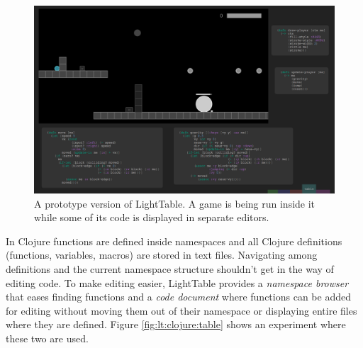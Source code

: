 \documentclass{./llncs2e/llncs}
\begin{document}

	\begin{figure}
	  \centering
	  \includegraphics[width=1.0\textwidth]{img/lt_game_example}
	    \caption{A prototype version of LightTable. A game is being run inside it while some of its code is displayed in separate editors.}
	  \label{fig:lt:draft:table}
	\end{figure} 

	In Clojure functions are defined inside namespaces and all Clojure definitions (functions, variables, macros) are stored in text files. 
	Navigating among definitions and the current namespace structure shouldn't get in the way of editing code. 
	To make editing easier, LightTable provides a \emph{namespace browser} that eases finding functions and a \emph{code document} where functions can be added for editing without moving them out of their namespace or displaying entire files where they are defined. 
	Figure \ref{fig:lt:clojure:table} shows an experiment where these two are used.
\end{document}
